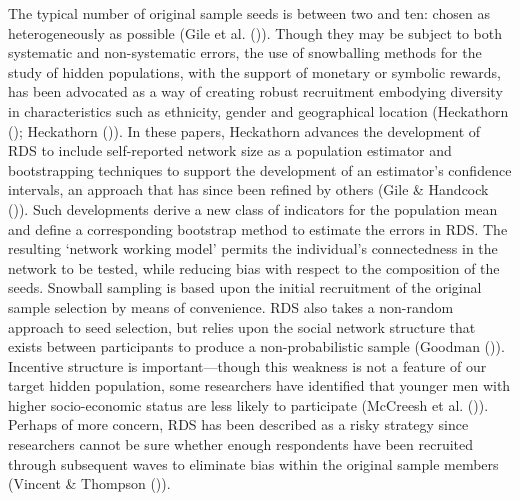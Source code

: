\documentclass[
  12pt,
]{article}
\theoremstyle{plain}
\theoremstyle{definition}
\begin{document}
The typical number of original sample seeds is between two and ten:
chosen as heterogeneously as possible (Gile et al.
()). Though they may be subject to
both systematic and non-systematic errors, the use of snowballing
methods for the study of hidden populations, with the support of
monetary or symbolic rewards, has been advocated as a way of creating
robust recruitment embodying diversity in characteristics such as
ethnicity, gender and geographical location (Heckathorn
(); Heckathorn
()). In these
papers, Heckathorn advances the development of RDS to include
self-reported network size as a population estimator and bootstrapping
techniques to support the development of an estimator's confidence
intervals, an approach that has since been refined by others (Gile \&
Handcock ()). Such developments
derive a new class of indicators for the population mean and define a
corresponding bootstrap method to estimate the errors in RDS. The
resulting `network working model' permits the individual's connectedness
in the network to be tested, while reducing bias with respect to the
composition of the seeds. Snowball sampling is based upon the initial
recruitment of the original sample selection by means of convenience.
RDS also takes a non-random approach to seed selection, but relies upon
the social network structure that exists between participants to produce
a non-probabilistic sample (Goodman
()). Incentive structure is
important---though this weakness is not a feature of our target hidden
population, some researchers have identified that younger men with
higher socio-economic status are less likely to participate (McCreesh et
al. ()). Perhaps of more
concern, RDS has been described as a risky strategy since researchers
cannot be sure whether enough respondents have been recruited through
subsequent waves to eliminate bias within the original sample members
(Vincent \& Thompson ()).
\end{document}
